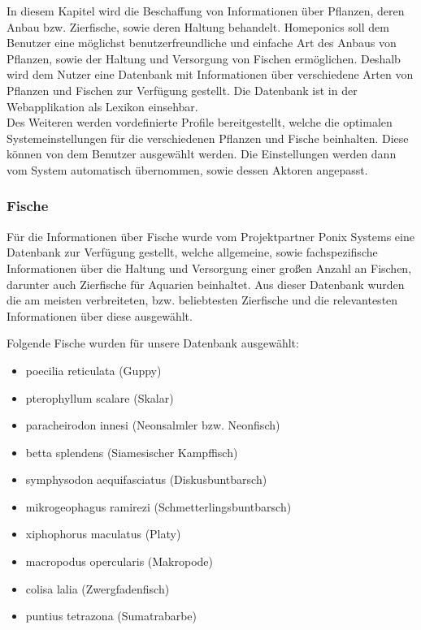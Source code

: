 In diesem Kapitel wird die Beschaffung von Informationen über Pflanzen, deren Anbau bzw. Zierfische, sowie deren Haltung behandelt. Homeponics soll dem Benutzer eine möglichst benutzerfreundliche und einfache Art des Anbaus von Pflanzen, sowie der Haltung und Versorgung von Fischen ermöglichen. Deshalb wird dem Nutzer eine Datenbank mit Informationen über verschiedene Arten von Pflanzen und Fischen zur Verfügung gestellt. Die Datenbank ist in der Webapplikation als Lexikon einsehbar. \\  Des Weiteren werden vordefinierte Profile bereitgestellt, welche die optimalen Systemeinstellungen für die verschiedenen Pflanzen und Fische beinhalten. Diese können von dem Benutzer ausgewählt werden. Die Einstellungen werden dann vom System automatisch übernommen, sowie dessen Aktoren angepasst.

\subsubsection{Fische}
Für die Informationen über Fische wurde vom Projektpartner Ponix Systems eine Datenbank zur Verfügung gestellt, welche allgemeine, sowie fachspezifische Informationen über die Haltung und Versorgung einer großen Anzahl an Fischen, darunter auch Zierfische für Aquarien beinhaltet. Aus dieser Datenbank wurden die am meisten verbreiteten, bzw. beliebtesten Zierfische und die relevantesten Informationen über diese ausgewählt.

Folgende Fische wurden für unsere Datenbank ausgewählt:

\begin{itemize}
    \item poecilia reticulata (Guppy)
    \item pterophyllum scalare (Skalar)
    \item paracheirodon innesi (Neonsalmler bzw. Neonfisch)
    \item betta splendens (Siamesischer Kampffisch)
    \item symphysodon aequifasciatus (Diskusbuntbarsch)
    \item mikrogeophagus ramirezi (Schmetterlingsbuntbarsch)
    \item xiphophorus maculatus (Platy)
    \item macropodus opercularis (Makropode)
    \item colisa lalia (Zwergfadenfisch)
    \item puntius tetrazona (Sumatrabarbe)
\end{itemize}


